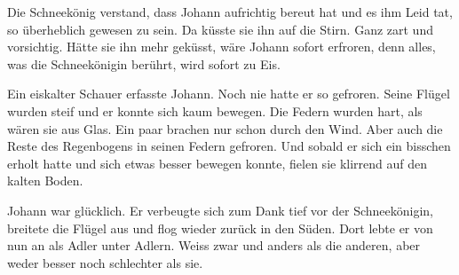 Die Schneekönig verstand, dass Johann aufrichtig bereut hat und es ihm Leid tat, so überheblich gewesen zu sein. Da küsste sie ihn auf die Stirn. Ganz zart und vorsichtig. Hätte sie ihn mehr geküsst, wäre Johann sofort erfroren, denn alles, was die Schneekönigin berührt, wird sofort zu Eis. 

Ein eiskalter Schauer erfasste Johann. Noch nie hatte er so gefroren. Seine Flügel wurden steif und er konnte sich kaum bewegen. Die Federn wurden hart, als wären sie aus Glas. Ein paar brachen nur schon durch den Wind. Aber auch die Reste des Regenbogens in seinen Federn gefroren. Und sobald er sich ein bisschen erholt hatte und sich etwas besser bewegen konnte, fielen sie klirrend auf den kalten Boden.

Johann war glücklich. Er verbeugte sich zum Dank tief vor der Schneekönigin, breitete die Flügel aus und flog wieder zurück in den Süden. Dort lebte er von nun an als Adler unter Adlern. Weiss zwar und anders als die anderen, aber weder besser noch schlechter als sie. \hfill {\color{red}\decofourleft}
